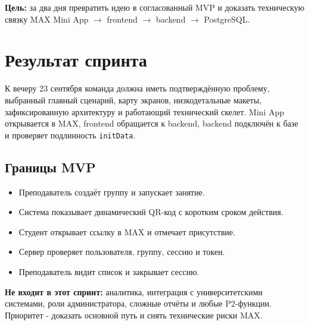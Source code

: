 \documentclass[11pt,a4paper]{article}
\newcommand{\code}[1]{\texttt{#1}}
\begin{document}
\begin{titlepage}\pagecolor{MaxPurple}\color{white}
\par
{}\par
\vspace{9mm}{\Large 22-23 сентября 2026}\par
\vfill
\begin{tcolorbox}[colback=white,colframe=white,arc=3mm,boxrule=0pt]\color{Ink}
\textbf{Цель:} за два дня превратить идею в согласованный MVP и доказать техническую связку MAX Mini App $\rightarrow$ frontend $\rightarrow$ backend $\rightarrow$ PostgreSQL.
\end{tcolorbox}
\vspace{8mm}{\large Команда: Данил, Рома, Никита, Амир}\par
\end{titlepage}\nopagecolor\color{Ink}

\section{Результат спринта}
\begin{goalbox}
К вечеру 23 сентября команда должна иметь подтверждённую проблему, выбранный главный сценарий, карту экранов, низкодетальные макеты, зафиксированную архитектуру и работающий технический скелет. Mini App открывается в MAX, frontend обращается к backend, backend подключён к базе и проверяет подлинность \code{initData}.
\end{goalbox}

\subsection{Границы MVP}
\begin{itemize}
  \item Преподаватель создаёт группу и запускает занятие.
  \item Система показывает динамический QR-код с коротким сроком действия.
  \item Студент открывает ссылку в MAX и отмечает присутствие.
  \item Сервер проверяет пользователя, группу, сессию и токен.
  \item Преподаватель видит список и закрывает сессию.
\end{itemize}
\begin{alertbox}
\textbf{Не входит в этот спринт:} аналитика, интеграция с университетскими системами, роли администратора, сложные отчёты и любые P2-функции. Приоритет - доказать основной путь и снять технические риски MAX.
\end{alertbox}
\end{document}
